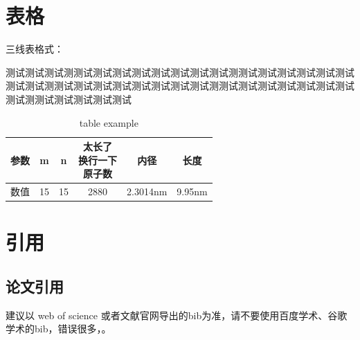 \section{表格}

三线表格式：

测试测试测试测测试测试测试测试测试测试测试测试测测试测试测试测试测试测试测试测试测测试测试测试测试测试测试测试测试测测试测试测试测试测试测试测试测试测测试测试测试测试测试


\begin{table}[hbt!]\label{tbl:mole}
    \centering
    \begin{tabular*}{0.9\textwidth}{@{\extracolsep{\fill}}cccccc}
        \toprule
        参数& m & n & \tabincell{c}{太长了\\换行一下\\原子数}  & 内径 & 长度\\
        \midrule
        数值 & 15 & 15  & 2880 & 2.3014nm & 9.95nm \\
        \bottomrule
    \end{tabular*}
    \caption{table example}
\end{table}


\section{引用}

\subsection{论文引用}

建议以 web of science 或者文献官网导出的bib为准，请不要使用百度学术、谷歌学术的bib，错误很多，\cite{partl2016, tenne1992polyhedral, tussyadiah2015hotels}。

